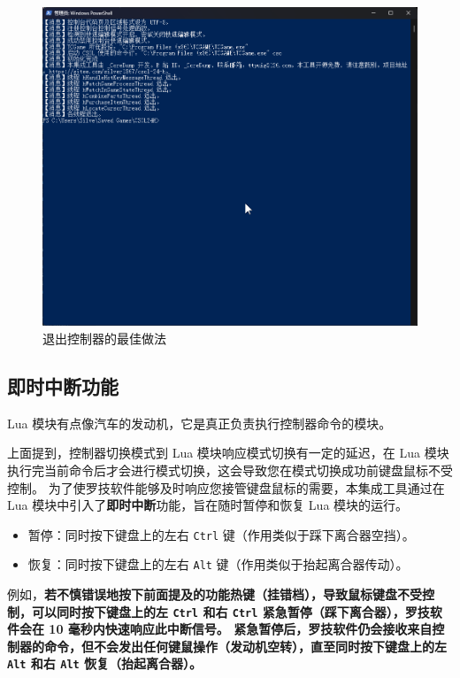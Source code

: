 \begin{figure}[H]
    \Centering
    \includegraphics[width=\textwidth]{docs/assets/intro/exit_controller.png}
    \caption{退出控制器的最佳做法}
\end{figure}

\subsection{即时中断功能}

Lua 模块有点像汽车的发动机，它是真正负责执行控制器命令的模块。

上面提到，控制器切换模式到 Lua 模块响应模式切换有一定的延迟，在 Lua 模块执行完当前命令后才会进行模式切换，这会导致您在模式切换成功前键盘鼠标不受控制。
为了使罗技软件能够及时响应您接管键盘鼠标的需要，本集成工具通过在 Lua 模块中引入了\textbf{即时中断}功能，旨在随时暂停和恢复 Lua 模块的运行。

\begin{itemize}
\item 暂停：同时按下键盘上的左右 \lstinline{Ctrl} 键（作用类似于踩下离合器空挡）。
\item 恢复：同时按下键盘上的左右 \lstinline{Alt} 键（作用类似于抬起离合器传动）。
\end{itemize}

例如，\textbf{\color{red}若不慎错误地按下前面提及的功能热键（挂错档），导致鼠标键盘不受控制，可以同时按下键盘上的左 \lstinline{Ctrl} 和右 \lstinline{Ctrl} 紧急暂停（踩下离合器），罗技软件会在 10 毫秒内快速响应此中断信号。
紧急暂停后，罗技软件仍会接收来自控制器的命令，但不会发出任何键鼠操作（发动机空转），直至同时按下键盘上的左 \lstinline{Alt} 和右 \lstinline{Alt} 恢复（抬起离合器）。}

